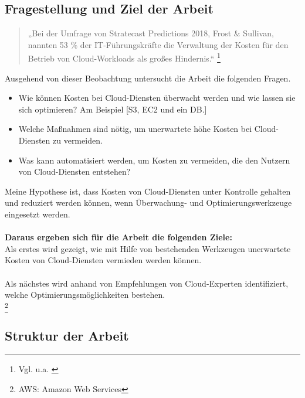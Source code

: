 \subsection{Fragestellung und Ziel der Arbeit}
\begin{quote}
„Bei der Umfrage von Stratecast Predictions 2018, Frost \& Sullivan, nannten 53 \% der IT-Führungskräfte die Verwaltung der Kosten für den Betrieb von Cloud-Workloads als großes Hindernis.“  
\footnote{Vgl. u.a. \cite{SP1}}
\end{quote}
Ausgehend von dieser Beobachtung untersucht die Arbeit die folgenden Fragen. 
\begin{itemize}
    \item
        Wie können Kosten bei Cloud-Diensten überwacht werden und wie lassen sie sich optimieren? 
        Am Beispiel [S3, EC2 und ein DB.]
    \item
        Welche Maßnahmen sind nötig, um unerwartete höhe Kosten bei Cloud-Diensten zu vermeiden.
    \item 
    Was kann automatisiert werden, um Kosten zu vermeiden, die den Nutzern von Cloud-Diensten entstehen?  
\end{itemize}
Meine Hypothese ist, dass Kosten von Cloud-Diensten unter Kontrolle gehalten und
reduziert werden können, wenn Überwachung- und Optimierungswerkzeuge eingesetzt werden.
\\\\
\textbf{Daraus ergeben sich für die Arbeit die folgenden Ziele:}\\ 
Als erstes wird gezeigt, wie mit Hilfe von bestehenden Werkzeugen unerwartete Kosten von Cloud-Diensten vermieden werden können.\\\\
Als nächstes wird anhand von Empfehlungen von Cloud-Experten identifiziert, welche Optimierungsmöglichkeiten bestehen.\\
\footnote{AWS: Amazon Web Services}

\newpage
\subsection{Struktur der Arbeit}

